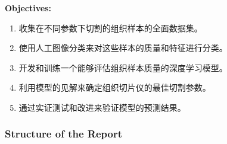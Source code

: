 \textbf{Objectives:}

\begin{enumerate}
\item 收集在不同参数下切割的组织样本的全面数据集。
\item 使用人工图像分类来对这些样本的质量和特征进行分类。
\item 开发和训练一个能够评估组织样本质量的深度学习模型。
\item 利用模型的见解来确定组织切片仪的最佳切割参数。
\item 通过实证测试和改进来验证模型的预测结果。
\end{enumerate}

\subsubsection{Structure of the Report}




